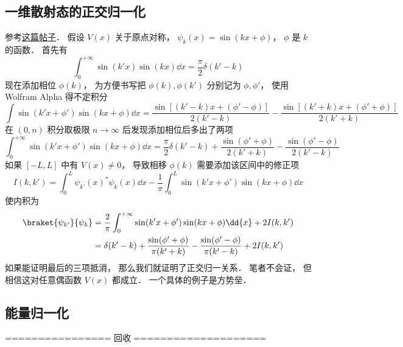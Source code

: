 \subsection{一维散射态的正交归一化}
参考\href{https://chaoli.club/index.php/4541/last}{这篇帖子}． 假设 $V(x)$ 关于原点对称， $\psi_{k}(x) = \sin(kx + \phi)$， $\phi$ 是 $k$ 的函数． 首先有
\begin{equation}
\int_{0}^{+\infty} \sin(k'x)\sin(kx)\dd{x} = \frac{\pi}{2}\delta(k'-k)
\end{equation}
现在添加相位 $\phi(k)$， 为方便书写把 $\phi(k),\phi(k')$ 分别记为 $\phi, \phi'$， 使用 Wolfram Alpha 得不定积分
\begin{equation}
\int \sin(k'x+\phi')\sin(kx+\phi) \dd{x} = \frac{\sin[(k'-k)x + (\phi'-\phi)]}{2(k'-k)}
- \frac{\sin[(k'+k)x+(\phi'+\phi)]}{2(k'+k)}
\end{equation}
在 $(0,n)$ 积分取极限 $n\to\infty$ 后发现添加相位后多出了两项
\begin{equation}
\int_{0}^{+\infty} \sin(k'x+\phi')\sin(kx+\phi) \dd{x} = \frac{\pi}{2}\delta(k'-k)
+ \frac{\sin(\phi'+\phi)}{2(k'+k)} - \frac{\sin(\phi'-\phi)}{2(k'-k)}
\end{equation}
如果 $[-L,L]$ 中有 $V(x) \ne 0$， 导致相移 $\phi(k)$ 需要添加该区间中的修正项
\begin{equation}
I(k,k') = \int_0^L \psi_{k'}(x)^* \psi_k(x) \dd{x}
-\frac{1}{\pi}\int_{0}^{L} \sin(k'x+\phi')\sin(kx+\phi) \dd{x}
\end{equation}
使内积为
\begin{equation}
\begin{aligned}
\braket{\psi_{k'}}{\psi_k} &= \frac{2}{\pi}\int_{0}^{+\infty} \sin(k'x+\phi')\sin(kx+\phi) \dd{x} + 2I(k,k')\\
&= \delta(k'-k) + \frac{\sin(\phi'+\phi)}{\pi(k'+k)} - \frac{\sin(\phi'-\phi)}{\pi(k'-k)} + 2I(k,k')
\end{aligned}
\end{equation}
如果能证明最后的三项抵消， 那么我们就证明了正交归一关系． 笔者不会证， 但相信这对任意偶函数 $V(x)$ 都成立． 一个具体的例子是方势垒．


\subsection{能量归一化}
================ 回收 ====================

